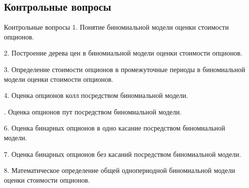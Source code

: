 \documentclass[_fin_decisions_lectures.tex]{subfiles}
\begin{document}
\subsection{Контрольные вопросы}
\begin{frame}[allowframebreaks]{Контрольные вопросы}
1. Понятие биномиальной модели оценки стоимости опционов.

2. Построение дерева цен в биномиальной модели оценки стоимости опционов.

3. Определение стоимости опционов в промежуточные периоды в биномиальной модели оценки стоимости опционов.

4. Оценка опционов колл посредством биномиальной модели.

. Оценка опционов пут посредством биномиальной модели.

6. Оценка бинарных опционов в одно касание посредством биномиальной модели.

7. Оценка бинарных опционов без касаний посредством биномиальной модели.

8. Математическое определение общей однопериодной биномиальной модели оценки стоимости опционов.
\end{frame}
\end{document}
